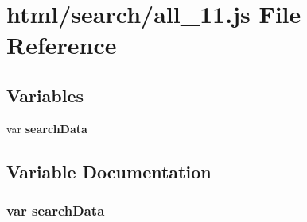 \section{html/search/all\-\_\-11.js File Reference}
\label{all__11_8js}
\subsection*{Variables}
\begin{DoxyCompactItemize}
\item 
var {\bf search\-Data}
\end{DoxyCompactItemize}


\subsection{Variable Documentation}
\subsubsection[{search\-Data}]{\setlength{\rightskip}{0pt plus 5cm}var search\-Data}\label{all__11_8js_ad01a7523f103d6242ef9b0451861231e}
